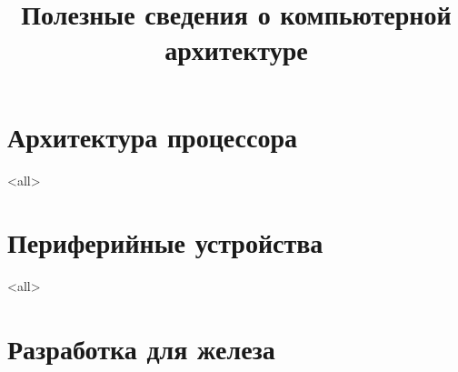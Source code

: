 

\title{Полезные сведения о компьютерной архитектуре}



\begin{frame}
  \frametitle{}
\end{frame}

\section{Архитектура процессора}
\mode<all>{}
\section{Периферийные устройства}
\mode<all>{}
\section{Разработка для железа}
